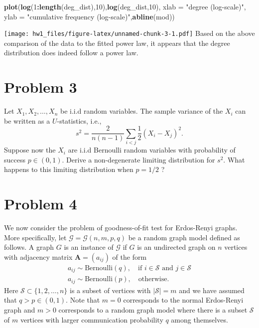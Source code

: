 \documentclass[
]{article}
\newenvironment{Shaded}{\begin{snugshade}}{\end{snugshade}}
\newcommand{\DataTypeTok}[1]{\textcolor[rgb]{0.13,0.29,0.53}{#1}}
\newcommand{\DecValTok}[1]{\textcolor[rgb]{0.00,0.00,0.81}{#1}}
\newcommand{\KeywordTok}[1]{\textcolor[rgb]{0.13,0.29,0.53}{\textbf{#1}}}
\newcommand{\NormalTok}[1]{#1}
\newcommand{\OperatorTok}[1]{\textcolor[rgb]{0.81,0.36,0.00}{\textbf{#1}}}
\newcommand{\StringTok}[1]{\textcolor[rgb]{0.31,0.60,0.02}{#1}}
\begin{document}
\begin{Shaded}
\begin{Highlighting}[]
\KeywordTok{plot}\NormalTok{(}\KeywordTok{log}\NormalTok{(}\DecValTok{1}\OperatorTok{:}\KeywordTok{length}\NormalTok{(deg_dist),}\DecValTok{10}\NormalTok{),}\KeywordTok{log}\NormalTok{(deg_dist,}\DecValTok{10}\NormalTok{),}
\DataTypeTok{xlab =} \StringTok{"degree (log-scale)"}\NormalTok{, }\DataTypeTok{ylab =} \StringTok{"cumulative frequency (log-scale)"}\NormalTok{,}\KeywordTok{abline}\NormalTok{(mod))}
\end{Highlighting}
\end{Shaded}

\texttt{[image: hw1\_files/figure-latex/unnamed-chunk-3-1.pdf]} Based on
the above comparison of the data to the fitted power law, it appears
that the degree distribution does indeed follow a power law.

\hypertarget{problem-3}{%
\section{Problem 3}\label{problem-3}}

Let \(X_1, X_2, \dots, X_n\) be i.i.d random variables. The sample
variance of the \(X_i\) can be written as a \(U\)-statistics, i.e.,
\[s^2 = \frac{2}{n(n-1)} \sum_{i < j} \frac{1}{2} (X_i - X_j)^2.\]
Suppose now the \(X_i\) are i.i.d Bernoulli random variables with
probability of success \(p \in (0,1)\). Derive a non-degenerate limiting
distribution for \(s^2\). What happens to this limiting distribution
when \(p = 1/2\) ?

\hypertarget{problem-4}{%
\section{Problem 4}\label{problem-4}}

We now consider the problem of goodness-of-fit test for Erdos-Renyi
graphs. More specifically, let \(\mathcal{G} = \mathcal{G}(n,m,p, q)\)
be a random graph model defined as follows. A graph \(G\) is an instance
of \(\mathcal{G}\) if \(G\) is an undirected graph on \(n\) vertices
with adjacency matrix \(\mathbf{A} = (a_{ij})\) of the form
\begin{gather*}
a_{ij} \sim \mathrm{Bernoulli}(q), \quad \text{if $i \in \mathcal{S}$ and $j \in \mathcal{S}$} \\
a_{ij} \sim \mathrm{Bernoulli}(p), \quad \text{otherwise}.
\end{gather*} Here \(\mathcal{S} \subset \{1,2,\dots,n\}\) is a subset
of vertices with \(|\mathcal{S}| = m\) and we have assumed that
\(q > p \in (0,1)\). Note that \(m = 0\) corresponds to the normal
Erdos-Renyi graph and \(m > 0\) corresponds to a random graph model
where there is a subset \(\mathcal{S}\) of \(m\) vertices with larger
communication probability \(q\) among themselves.
\end{document}
